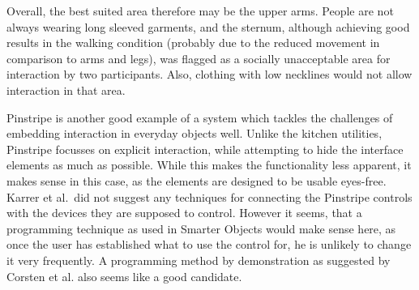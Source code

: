 Overall, the best suited area therefore may be the upper arms.
People are not always wearing long sleeved garments, and the sternum, although achieving good results in the walking condition (probably due to the reduced movement in comparison to arms and legs), was flagged as a socially unacceptable area for interaction by two participants.
Also, clothing with low necklines  would not allow interaction in that area.

Pinstripe is another good example of a system which tackles the challenges of embedding interaction in everyday objects well.
Unlike the kitchen utilities, Pinstripe focusses on explicit interaction, while attempting to hide the interface elements as much as possible.
While this makes the functionality less apparent, it makes sense in this case, as the elements are designed to be usable eyes-free.
Karrer et al.\ did not suggest any techniques for connecting the Pinstripe controls with the devices they are supposed to control.
However it seems, that a programming technique as used in Smarter Objects \cite{heun13smarter} would make sense here, as once the user has established what to use the control for, he is unlikely to change it very frequently.
A programming method by demonstration \cite{corsten13} as suggested by Corsten et al. also seems like a good candidate.

